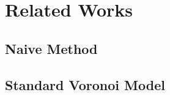\section{Related Works}\label{rel}
\subsection{Naive Method}\label{rel:sec:nm}
\subsection{Standard Voronoi Model}\label{rel:sec:svm}
